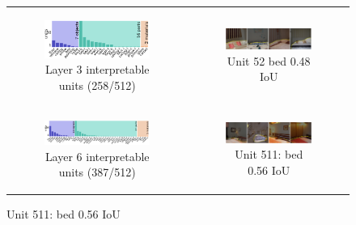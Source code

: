 \documentclass{article}
\begin{document}
\begin{figure}[h!]
\caption{StyleGAN layers: Interpretable units distribution and highest IoU unit sample images}
\hspace{-3em}\begin{tabular}{c c }
    \begin{subfigure}[h!]{0.6\textwidth}
        \caption{Layer 3 interpretable units (258/512)}
        \includegraphics[scale=0.4]{images/sg_layer3.png}
    \end{subfigure} &
    \begin{subfigure}[h!]{0.5\textwidth}
        \caption{Unit 52 bed 0.48 IoU}
        \includegraphics[scale=0.2]{images/sg_layer3_unit52_bedIoU_0.48.png}
    \end{subfigure} \\
    \begin{subfigure}[h!]{0.6\textwidth}
        \caption{Layer 6 interpretable units (387/512)}
        \includegraphics[scale=0.3]{images/sg_layer6.png}
    \end{subfigure} &
    \begin{subfigure}[h!]{0.5\textwidth}
        \caption{Unit 511: bed 0.56 IoU}
        \includegraphics[scale=0.2]{images/sg_layer6_u511_bed_iou0.56.png}

\end{subfigure}
\end{tabular}
\end{figure}
\end{document}
